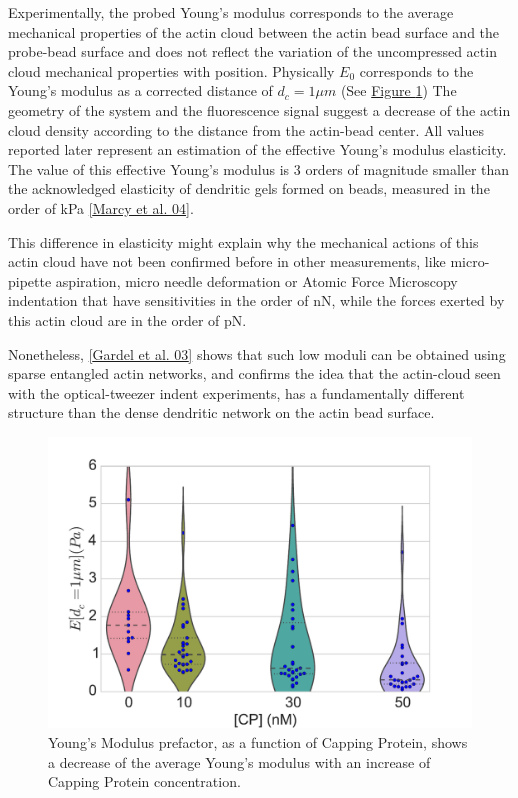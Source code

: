\documentclass[A4paperpaper,11pt,english]{sphinxmanual}
\begin{document}
Experimentally, the probed Young's modulus corresponds to the average mechanical
properties of the actin cloud between the actin bead surface and the
probe-bead surface and does not reflect the variation of the uncompressed actin cloud mechanical
properties with position.
Physically \(E_0\) corresponds to the Young's modulus as a corrected distance of \(d_c = 1 \mu{}m\)
(See \hyperref[parts/part3:ev]{Figure  \ref*{parts/part3:ev}})
The geometry of the
system and the fluorescence signal suggest a decrease of the actin cloud density according to the distance from the actin-bead center. All values
reported later represent an estimation of the effective Young’s modulus elasticity. The value of this effective Young's modulus is 3 orders of magnitude
smaller than the acknowledged elasticity of dendritic gels formed on beads, measured in the
order of kPa {\hyperref[parts/part3:marcy2004]{{[}Marcy et al. 04{]}}}.

This difference in elasticity might explain why the mechanical actions of this actin cloud have not been
confirmed before in other measurements, like micro-pipette aspiration,
micro needle deformation or Atomic Force Microscopy indentation that have
sensitivities in the order of nN, while the forces exerted by this actin cloud
are in the order of pN.

Nonetheless, {\hyperref[parts/part3:gardel2003]{{[}Gardel et al. 03{]}}} shows that such low moduli can be obtained using
sparse entangled actin networks, and confirms the idea that the actin-cloud seen
with the optical-tweezer indent experiments, has a fundamentally different
structure than the dense dendritic network on the actin
bead surface.
\begin{figure}[htbp]
\centering
\capstart

\includegraphics[width=0.800\linewidth]{E0_violin.pdf}
\caption{Young's Modulus prefactor, as a function of Capping Protein, shows a decrease of the
average Young's modulus with an increase of Capping Protein concentration.}\label{parts/part3:ev}\end{figure}
\end{document}
